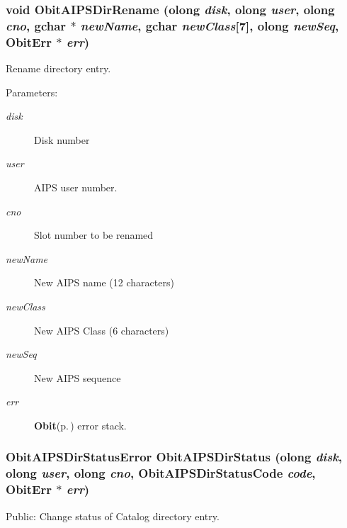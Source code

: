 \subsubsection{\setlength{\rightskip}{0pt plus 5cm}void Obit\-AIPSDir\-Rename ({\bf olong} {\em disk}, {\bf olong} {\em user}, {\bf olong} {\em cno}, gchar $\ast$ {\em new\-Name}, gchar {\em new\-Class}[7], {\bf olong} {\em new\-Seq}, {\bf Obit\-Err} $\ast$ {\em err})}\label{ObitAIPSDir_8c_a24}


Rename directory entry. 

\begin{Desc}
\item[Parameters:]
\begin{description}
\item[{\em disk}]Disk number \item[{\em user}]AIPS user number. \item[{\em cno}]Slot number to be renamed \item[{\em new\-Name}]New AIPS name (12 characters) \item[{\em new\-Class}]New AIPS Class (6 characters) \item[{\em new\-Seq}]New AIPS sequence \item[{\em err}]{\bf Obit}{\rm (p.\,\pageref{structObit})} error stack. \end{description}
\end{Desc}
\subsubsection{\setlength{\rightskip}{0pt plus 5cm}Obit\-AIPSDir\-Status\-Error Obit\-AIPSDir\-Status ({\bf olong} {\em disk}, {\bf olong} {\em user}, {\bf olong} {\em cno}, Obit\-AIPSDir\-Status\-Code {\em code}, {\bf Obit\-Err} $\ast$ {\em err})}\label{ObitAIPSDir_8c_a27}


Public: Change status of Catalog directory entry. 

